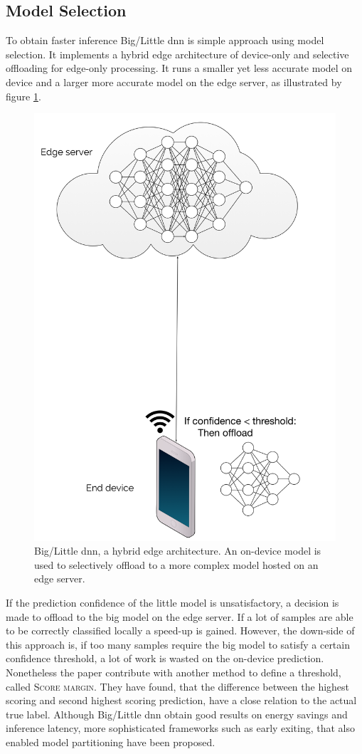 \subsection{Model Selection}

To obtain faster inference Big/Little \gls{dnn} \cite{park_big/little_2015} is simple approach using model selection. It implements a hybrid edge architecture of device-only and selective offloading for edge-only processing. It runs a smaller yet less accurate model on device and a larger more accurate model on the edge server, as illustrated by figure \ref{fig:big/little-dnn}. 

\begin{figure}
	\centering
	\includegraphics[width=.5\linewidth]{figures/models/big_little_dnn}
	\caption[Big/Little \gls{dnn} architecture]{Big/Little \gls{dnn}, a hybrid edge architecture. An on-device model is used to selectively offload to a more complex model hosted on an edge server.}
	\label{fig:big/little-dnn}
\end{figure}

If the prediction confidence of the little model is unsatisfactory, a decision is made to offload to the big model on the edge server. If a lot of samples are able to be correctly classified locally a speed-up is gained. However, the down-side of this approach is, if too many samples require the big model to satisfy a certain confidence threshold, a lot of work is wasted on the on-device prediction. Nonetheless the paper \cite{park_big/little_2015} contribute with another method to define a threshold, called \textsc{Score margin}. They have found, that the difference between the highest scoring and second highest scoring prediction, have a close relation to the actual true label. Although Big/Little \gls{dnn} obtain good results on energy savings and inference latency, more sophisticated frameworks such as early exiting, that also enabled model partitioning have been proposed.

